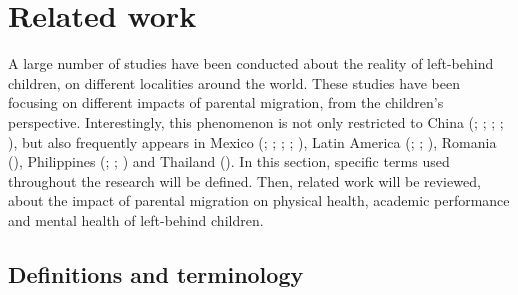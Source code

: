 \section{Related work}
\label{sec:related-work}

A large number of studies have been conducted about the reality of left-behind children, on different localities around the world. These studies have been focusing on different impacts of parental migration, from the children's perspective. Interestingly, this phenomenon is not only restricted to China (\cite{song2009health}; \cite{he2012depression}; \cite{guo2017effect}; \cite{fan2010emotional}; \cite{bai2017effect}), but also frequently appears in Mexico (\cite{sawyer2016money}; \cite{kanaiaupuni2000reframing}; \cite{hildebrandt2005effects}; \cite{fernandez1998fathers}; \cite{dreby2007children}), Latin America (\cite{mundial2006development}; \cite{acosta2007impact}; \cite{anton2010impact}), Romania (\cite{botezat2014impact}), Philippines (\cite{yang2008international}; \cite{cortes2015feminization}; \cite{arguillas2010impact}) and Thailand (\cite{jampaklay2006parental}). In this section, specific terms used throughout the research will be defined. Then, related work will be reviewed, about the impact of parental migration on physical health, academic performance and mental health of left-behind children. 

\subsection{Definitions and terminology}
\label{subsec:definitions_and_terminology}


